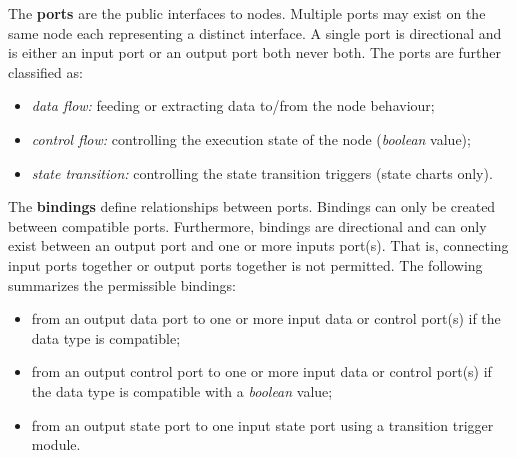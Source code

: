 The \textbf{ports} are the public interfaces to nodes. Multiple ports may exist on the same node each representing a distinct interface. A single port is directional and is either an input port or an output port both never both. The ports are further classified as:

\begin{itemize}
\item \emph{data flow:} feeding or extracting data to\slash from the node behaviour;

\item \emph{control flow:} controlling the execution state of the node (\emph{boolean} value);

\item \emph{state transition:} controlling the state transition triggers (state charts only).

\end{itemize}

The \textbf{bindings} define relationships between ports. Bindings can only be created between compatible ports. Furthermore, bindings are directional and can only exist between an output port and one or more inputs port(s). That is, connecting input ports together or output ports together is not permitted. The following summarizes the permissible bindings:

\begin{itemize}
\item from an output data port to one or more input data or control port(s) if the data type is compatible;

\item from an output control port to one or more input data or control port(s) if the data type is compatible with a \emph{boolean} value;

\item from an output state port to one input state port using a transition trigger module.

\end{itemize}

